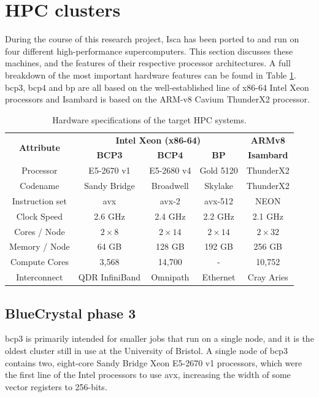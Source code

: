 \documentclass[a4paper,11pt]{report}
\begin{document}
\section{HPC clusters}
During the course of this research project, Isca has been ported to and run on four different high-performance supercomputers. This section discusses these machines, and the features of their respective processor architectures. A full breakdown of the most important hardware features can be found in Table \ref{tbl:hardware}. \gls{bcp3}, \gls{bcp4} and \gls{bp} are all based on the well-established line of x86-64 Intel Xeon processors and Isambard is based on the ARM-v8 Cavium ThunderX2 processor.
\begin{table}[!ht]
\centering
\caption[Hardware specifications of the target HPC systems]{Hardware specifications of the target HPC systems. }
\begin{tabular}{@{\extracolsep{4pt}}ccccc}
\toprule 
\multirow{2}{*}{\textbf{Attribute}} & \multicolumn{3}{c}{\textbf{Intel Xeon (x86-64)}} & \multicolumn{1}{c}{\textbf{ARMv8}}\\

				\cmidrule(lr){2-4} \cmidrule(lr){5-5}

 				& {\textbf{BCP3}} 	& {\textbf{BCP4}} 		& {\textbf{BP}} 		& {\textbf{Isambard}} \\
\midrule
Processor	   		& E5-2670 v1 		& E5-2680 v4			& Gold 5120			& ThunderX2	\\
Codename            	& Sandy Bridge	        & Broadwell         		& Skylake       		   	& ThunderX2   	\\
Instruction set		& \gls{avx}		& \gls{avx}-2			& \gls{avx}-512			& NEON		\\
Clock Speed	   	& 2.6 GHz		    	& 2.4 GHz				& 2.2 GHz				&  2.1 GHz 	\\
Cores / Node		& $2\times8$		& $2\times14$			& $2 \times 14$			& $2\times32$	\\
Memory / Node		& 64 GB			& 128 GB				& 192 GB					& 256 GB		\\
Compute Cores		& 3,568		    	&14,700				& -					& 10,752 		\\
Interconnect		&  QDR InfiniBand	& Omnipath			& Ethernet			& Cray Aries	\\
\bottomrule
\end{tabular}
\label{tbl:hardware}
\end{table}

\subsection{BlueCrystal phase 3}
\gls{bcp3} is primarily intended for smaller jobs that run on a single node, and it is the oldest cluster still in use at the University of Bristol. A single node of \gls{bcp3} contains two, eight-core Sandy Bridge Xeon E5-2670 v1 processors, which were the first line of the Intel processors to use \gls{avx}, increasing the width of some vector registers to 256-bits. 
\end{document}
